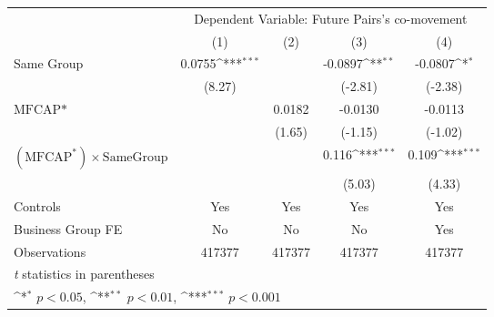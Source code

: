 {
\def\sym#1{\ifmmode^{#1}\else\(^{#1}\)\fi}
\begin{tabular}{l*{4}{c}}
\hline\hline
                &\multicolumn{4}{c}{Dependent Variable: Future Pairs's co-movement}         \\\cmidrule(lr){2-5}
                &\multicolumn{1}{c}{(1)}         &\multicolumn{1}{c}{(2)}         &\multicolumn{1}{c}{(3)}         &\multicolumn{1}{c}{(4)}         \\
\hline
Same Group      &   0.0755\sym{***}&                  &  -0.0897\sym{**} &  -0.0807\sym{*}  \\
                &   (8.27)         &                  &  (-2.81)         &  (-2.38)         \\
[1em]
$ \text{MFCAP*} $&                  &   0.0182         &  -0.0130         &  -0.0113         \\
                &                  &   (1.65)         &  (-1.15)         &  (-1.02)         \\
[1em]
 $ (\text{MFCAP}^*) \times {\text{SameGroup} }  $ &                  &                  &    0.116\sym{***}&    0.109\sym{***}\\
                &                  &                  &   (5.03)         &   (4.33)         \\
\hline
Controls        &      Yes         &      Yes         &      Yes         &      Yes         \\
Business Group FE&       No         &       No         &       No         &      Yes         \\
Observations    &   417377         &   417377         &   417377         &   417377         \\
\hline\hline
\multicolumn{5}{l}{\footnotesize \textit{t} statistics in parentheses}\\
\multicolumn{5}{l}{\footnotesize \sym{*} \(p<0.05\), \sym{**} \(p<0.01\), \sym{***} \(p<0.001\)}\\
\end{tabular}
}
